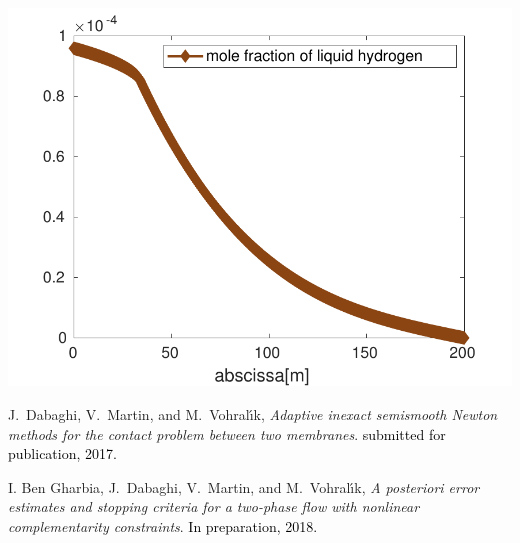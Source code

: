 \documentclass[a0,portrait]{a0poster}
\begin{document}
\begin{multicols}{2}
\begin{tcolorbox}
\begin{minipage}[c]{.32\linewidth}
\end{minipage}\hfill
\begin{minipage}[c]{.33\linewidth}
   \centering
\includegraphics[width=\textwidth]{image/image_Jad/modif_mole_frac_cv_solver_1000_cells-eps-converted-to}     
\end{minipage}

\end{tcolorbox}
\begin{tcolorbox}
[enhanced, breakable,colback=white,frame style={left color=white!25!black,
right color=blue!75!black},
width=\dimexpr0.45\textwidth+18mm\relax,enlarge left by=0mm, title = \huge Bibliography, 
bottomrule=3mm, leftrule=1mm, toptitle = 3mm, bottomtitle = 3mm, center title]

{
{\sc J.~Dabaghi, V.~Martin, and M.~Vohral{\'{\i}}k}, {\em Adaptive inexact
  semismooth Newton methods for the contact problem between two membranes}.
\textcolor{black}{submitted for publication, 2017.}
}

{
{\sc I. Ben Gharbia, J.~Dabaghi, V.~Martin, and M.~Vohral{\'{\i}}k}, {\em A posteriori error estimates and stopping criteria for a two-phase flow with nonlinear complementarity constraints}.
\textcolor{black}{In preparation, 2018.}
}
\end{tcolorbox}



\end{multicols}
\end{document}
